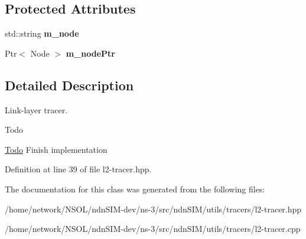 \subsection*{Protected Attributes}
\begin{DoxyCompactItemize}
\item 
std\+::string {\bfseries m\+\_\+node}\hypertarget{classns3_1_1L2Tracer_a10261699eb9dcb6d39a012e2c6a30c36}{}\label{classns3_1_1L2Tracer_a10261699eb9dcb6d39a012e2c6a30c36}

\item 
Ptr$<$ Node $>$ {\bfseries m\+\_\+node\+Ptr}\hypertarget{classns3_1_1L2Tracer_abaf2400d51675e87e9b90c92db6d17b2}{}\label{classns3_1_1L2Tracer_abaf2400d51675e87e9b90c92db6d17b2}

\end{DoxyCompactItemize}


\subsection{Detailed Description}
Link-\/layer tracer. 

\begin{DoxyRefDesc}{Todo}
\item[\hyperlink{todo__todo000049}{Todo}]Finish implementation \end{DoxyRefDesc}


Definition at line 39 of file l2-\/tracer.\+hpp.



The documentation for this class was generated from the following files\+:\begin{DoxyCompactItemize}
\item 
/home/network/\+N\+S\+O\+L/ndn\+S\+I\+M-\/dev/ns-\/3/src/ndn\+S\+I\+M/utils/tracers/l2-\/tracer.\+hpp\item 
/home/network/\+N\+S\+O\+L/ndn\+S\+I\+M-\/dev/ns-\/3/src/ndn\+S\+I\+M/utils/tracers/l2-\/tracer.\+cpp\end{DoxyCompactItemize}
